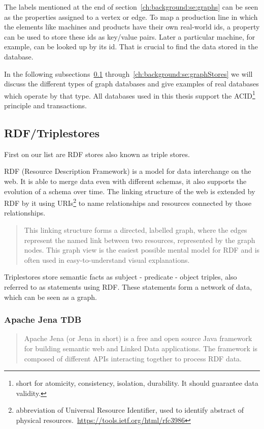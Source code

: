 The labels mentioned at the end of section~\ref{ch:background:se:graphs} can be seen as the properties assigned to a vertex or edge.
To map a production line in which the elements like machines and products have their own real-world ids,
a property can be used to store these ids as key/value pairs.
Later a particular machine,
for example,
can be looked up by its id.
That is crucial to find the data stored in the database.

In the following subsections~\ref{ch:background:se:rdfTriplestores} through~\ref{ch:background:se:graphStores} we will discuss the different types of graph databases and give examples of real databases which operate by that type.
All databases used in this thesis support the ACID\footnote{short for atomicity, consistency, isolation, durability. It should guarantee data validity.} principle and transactions.

\subsection{RDF/Triplestores}
\label{ch:background:se:rdfTriplestores}
First on our list are RDF stores also known as triple stores.

RDF (Resource Description Framework) is a model for data interchange on the web.
It is able to merge data even with different schemas, it also supports the evolution of a schema over time.
The linking structure of the web is extended by RDF by it using URIs\footnote{abbreviation of Universal Resource Identifier, used to identify abstract of physical resources.~\url{https://tools.ietf.org/html/rfc3986}} to name relationships and resources connected by those relationships.~\cite[4]{Ontotext2014}

\blockquote[\cite{W3C2014}]{This linking structure forms a directed, labelled graph, where the edges represent the named link between two resources, represented by the graph nodes.
This graph view is the easiest possible mental model for RDF and is often used in easy-to-understand visual explanations.}

Triplestores store semantic facts as subject - predicate - object triples,
also referred to as statements using RDF.
These statements form a network of data,
which can be seen as a graph.~\cite[4]{Ontotext2014}

\subsubsection{Apache Jena TDB}
\label{ch:background:se:apacheJena}
\blockquote[\cite{Apache2015}]{Apache Jena (or Jena in short) is a free and open source Java framework for building semantic web and Linked Data applications.
The framework is composed of different APIs interacting together to process RDF data.}


